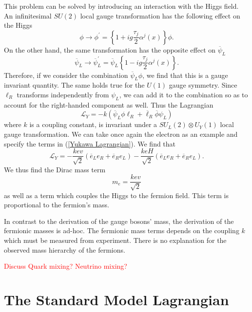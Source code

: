 \documentclass[10pt,a4paper]{book}
\newcommand\todo[1]{\textcolor{red}{#1}}
\begin{document}
This problem can be solved by introducing an interaction with the Higgs field. An infinitesimal $SU(2)$ local gauge transformation has the following effect on the Higgs
\begin{equation}
\phi \rightarrow \phi^\prime = \left\lbrace 1 + ig\frac{\tau_j}{2}\alpha^j(x)\right\rbrace\phi.
\end{equation} 
On the other hand, the same transformation has the opposite effect on $\overline{\psi}_L$
\begin{equation}
\overline{\psi}_L \rightarrow \overline{\psi}^\prime_L = \overline{\psi}_L\left\lbrace 1 - ig\frac{\tau_j}{2}\alpha^j(x) \right\rbrace.
\end{equation}
Therefore, if we consider the combination $\overline{\psi}_L\phi$, we find that this is a gauge invariant quantity. The same holds true for the $U(1)$ gauge symmetry.
Since $\ell_R$ transforms independently from $\psi_L$, we can add it to the combination so as to account for the right-handed component as well. Thus the Lagrangian
\begin{equation}
\label{Yukawa Lagrangian}
\mathcal{L}_Y = -k\left(\overline{\psi}_L\phi\ell_R + \overline{\ell}_R\overline{\phi}\psi_L\right)
\end{equation}
where $k$ is a coupling constant, is invariant under a $SU_L(2)\otimes U_Y(1)$ local gauge transformation.
We can take once again the electron as an example and specify the terms in (\ref{Yukawa Lagrangian}). We find that
\begin{equation}
\mathcal{L}_Y = -\frac{kev}{\sqrt{2}}\left(\overline{e}_L e_R +\overline{e}_R e_L\right) - \frac{keH}{\sqrt{2}}\left(\overline{e}_L e_R +\overline{e}_R e_L\right).
\end{equation}
We thus find the Dirac mass term
\begin{equation}
m_e = \frac{kev}{\sqrt{2}}
\end{equation}
as well as a term which couples the Higgs to the fermion field. This term is proportional to the fermion's mass. 

In contrast to the derivation of the gauge bosons' mass, the derivation of the fermionic masses is ad-hoc. The fermionic mass terms depends on the coupling $k$ which must be measured from experiment. There is no explanation for the observed mass hierarchy of the fermions.

\todo{Discuss Quark mixing? Neutrino mixing?}
\section{The Standard Model Lagrangian}
\end{document}
